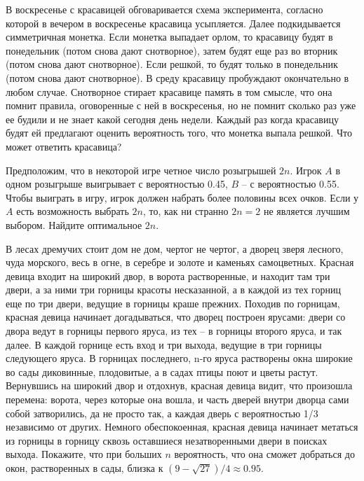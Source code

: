 \begin{problem}
В воскресенье с красавицей обговаривается схема эксперимента, согласно которой в вечером в воскресенье красавица усыпляется. Далее подкидывается симметричная монетка. Если монетка выпадает орлом, то красавицу будят в понедельник (потом снова дают снотворное), затем будят еще раз во вторник (потом снова дают снотворное). Если решкой, то будят только в понедельник (потом снова дают снотворное). В среду красавицу пробуждают окончательно в любом случае. Снотворное стирает красавице память в том смысле, что она помнит правила, оговоренные с ней в воскресенья, но не помнит сколько раз уже ее будили и не знает какой сегодня день недели. Каждый раз когда красавицу будят ей предлагают оценить вероятность того, что монетка выпала решкой. Что может ответить красавица?
\end{problem}

\begin{problem} 
Предположим, что в некоторой игре четное число розыгрышей $2n$. Игрок  $A$ в одном розыгрыше выигрывает с вероятностью 0.45, $B$ --  с вероятностью 0.55. Чтобы выиграть в игру, игрок должен набрать более половины всех очков. Если у  $A$ есть возможность выбрать  $2n$, то, как ни странно $2n=2$ не является лучшим выбором. Найдите оптимальное $2n$.    
\end{problem}

\begin{problem}[А.Н. Соболевский]
В лесах дремучих стоит дом не дом, чертог не чертог, а дворец зверя лесного, чуда морского, весь в огне, в серебре и золоте и каменьях самоцветных. Красная девица входит на широкий двор, в ворота растворенные, и находит там три двери, а за ними три горницы красоты несказанной, а в каждой из тех горниц еще по три двери, ведущие в горницы краше прежних.
Походив по горницам, красная девица начинает догадываться, что дворец построен ярусами: двери со двора ведут в горницы первого яруса, из тех -- в горницы второго яруса, и так далее. В каждой горнице есть вход и три выхода, ведущие в три горницы следующего яруса. В горницах последнего, n-го яруса растворены окна широкие во сады диковинные, плодовитые, а в садах птицы поют и цветы растут.
Вернувшись на широкий двор и отдохнув, красная девица видит, что произошла перемена: ворота, через которые она вошла, и часть дверей внутри дворца сами собой затворились,
да не просто так, а каждая дверь с вероятностью 1/3 независимо от других. Немного обеспокоенная, красная девица начинает метаться из горницы в горницу сквозь оставшиеся незатворенными двери в поисках выхода. Покажите, что при больших $n$ вероятность, что
она сможет добраться до окон, растворенных в сады, близка к $(9 - \sqrt{27}) / 4 \approx 0.95$.
\end{problem}


